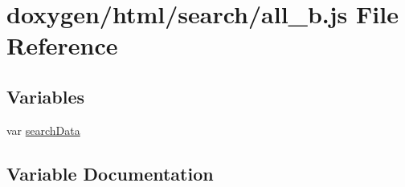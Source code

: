 \hypertarget{a00056}{}\section{doxygen/html/search/all\+\_\+b.js File Reference}
\label{a00056}
\subsection*{Variables}
\begin{DoxyCompactItemize}
\item 
var \hyperlink{a00056_ad01a7523f103d6242ef9b0451861231e}{search\+Data}
\end{DoxyCompactItemize}


\subsection{Variable Documentation}
\hypertarget{a00056_ad01a7523f103d6242ef9b0451861231e}{}
